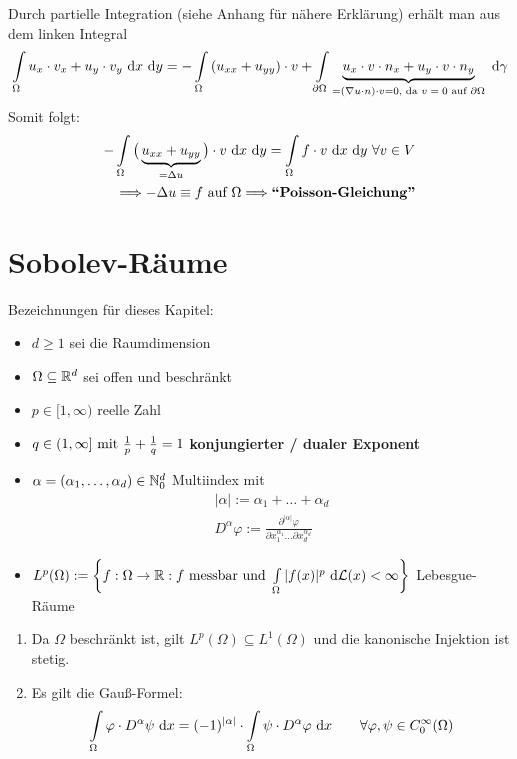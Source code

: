 Durch partielle Integration (siehe Anhang für nähere Erklärung) erhält man aus dem linken Integral
\begin{align*}
	\int\limits_\Omega u_x\cdot v_x+u_y\cdot v_y\d x\d y
	=-\int\limits_\Omega\left(u_{xx}+u_{yy}\right)\cdot v
	+\int\limits_{\partial\Omega}\underbrace{u_x\cdot v\cdot n_x+u_y\cdot v\cdot n_y}_{=(\nabla u\cdot n)\cdot v=0\text{, da $v=0$ auf }\partial\Omega}\d\gamma
\end{align*}
Somit folgt:
\begin{align*}
	-\int\limits_\Omega\big(\underbrace{u_{xx}+u_{yy}}_{=\Delta u}\big)\cdot v\d x\d y=\int\limits_\Omega f\cdot v\d x\d y~\forall v\in V\\
	\Longrightarrow-\Delta u\equiv f\text{ auf }\Omega\Longrightarrow\textbf{``Poisson-Gleichung''}
\end{align*}

\section{Sobolev-Räume}
Bezeichnungen für dieses Kapitel:

\begin{itemize}
	\item $d\geq1$ sei die Raumdimension
	\item $\Omega\subseteq\R^d$ sei offen und beschränkt
	\item $p\in[1,\infty)$ reelle Zahl
	\item $q\in(1,\infty]\mit\frac{1}{p}+\frac{1}{q}=1$ \textbf{konjungierter / dualer Exponent}
	\item $\alpha=(\alpha_1,\ldots,\alpha_d)\in\N_0^d$ Multiindex mit
	\begin{align*}
		|\alpha|:=\alpha_1+\ldots+\alpha_d\\
		D^\alpha\varphi:=\frac{\partial^{|\alpha|}\varphi}{\partial x_1^{\alpha_1}\hdots\partial x_d^{\alpha_d}}
	\end{align*}
	\item $L^p(\Omega):=\left\lbrace f:\Omega\to\R:f\text{ messbar und }\int\limits_\Omega |f(x)|^p\d\mathcal{L}(x)<\infty\right\rbrace$ Lebesgue-Räume
\end{itemize}

\begin{bemerkung}
	\begin{enumerate}
		\item Da $\Omega$ beschränkt ist, gilt $L^p(\Omega)\subseteq L^1(\Omega)$ und die kanonische Injektion ist stetig.
		\item Es gilt die Gauß-Formel:
		\begin{align}\label{GaussFormel}
			\int\limits_\Omega\varphi\cdot D^\alpha\psi\d x=(-1)^{|\alpha|}\cdot\int\limits_\Omega\psi\cdot D^\alpha\varphi\d x\qquad\forall \varphi,\psi\in C_0^\infty(\Omega)
		\end{align}
	\end{enumerate}
\end{bemerkung}

